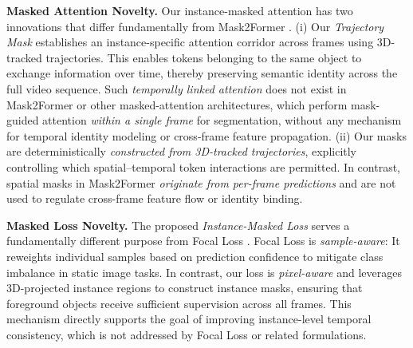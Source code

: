 \textbf{Masked Attention Novelty. }
Our instance-masked attention has two innovations that differ fundamentally from Mask2Former \cite{cheng2022maskedattentionmasktransformeruniversal}.
(i) Our \emph{Trajectory Mask} establishes an instance-specific attention corridor across frames using 3D-tracked trajectories.
This enables tokens belonging to the same object to exchange information over time, 
thereby preserving semantic identity across the full video sequence. 
Such \textit{temporally linked attention} does not exist in Mask2Former or other masked-attention architectures, which 
perform mask-guided attention \textit{within a single frame} for segmentation, without any mechanism for temporal identity modeling or cross-frame feature propagation. 
%
(ii) Our masks are deterministically \textit{constructed from 3D-tracked trajectories}, explicitly controlling which spatial–temporal token interactions are permitted.
In contrast, spatial masks in Mask2Former \textit{originate from per-frame predictions} and are not used to regulate cross-frame feature flow or identity binding. 






\textbf{Masked Loss Novelty.}
The proposed \emph{Instance-Masked Loss} serves a fundamentally different purpose from Focal Loss \cite{lin2018focallossdenseobject}.  
Focal Loss is \emph{sample-aware}: It reweights individual samples based on prediction confidence to mitigate class imbalance in static image tasks.  
In contrast, our loss is \emph{pixel-aware} and leverages 3D-projected instance regions to 
construct instance masks, ensuring that foreground objects receive sufficient supervision across all frames.
This mechanism directly supports the goal of improving instance-level temporal consistency, which is not addressed by Focal Loss or related formulations.






